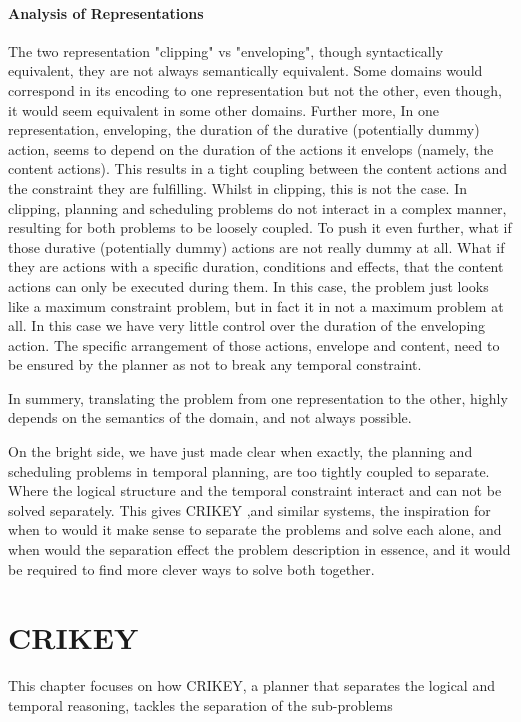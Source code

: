 \documentclass
[a4paper
,english
,parskip=half
,bibliography=totoc
]{scrreprt}
\begin{document}
        \subsubsection{Analysis of Representations}
        The two representation "clipping" vs "enveloping", though syntactically equivalent, they are not always semantically equivalent.
        Some domains would correspond in its encoding to one representation but not the other, even though, it would seem equivalent in some other domains. Further more, In one representation,
        enveloping, the duration of the durative (potentially dummy) action, seems to depend on the duration of the actions it envelops (namely, the content actions). This results in a tight coupling between the content actions and the constraint they are fulfilling. Whilst in clipping, this is not the case. In clipping, planning and scheduling problems do not interact in a complex manner, resulting for both problems to be loosely coupled.
        To push it even further, what if those durative (potentially dummy) actions are not really dummy at all. What if they are actions with a specific duration, conditions and effects, that the content actions can only be executed during them. In this case, the problem just looks like a maximum constraint problem, but in fact it in not a maximum problem at all. In this case we have very little control over the duration of the enveloping action. The specific arrangement of those actions, envelope and content, need to be ensured by the planner as not to break any temporal constraint.

         In summery, translating the problem from one representation to the other, highly depends on the semantics of the domain, and not always possible.
        
        On the bright side, we have just made clear when exactly, the planning and scheduling problems in temporal planning, are too tightly coupled to separate. Where the logical structure and the temporal constraint interact and can not be solved separately. This gives CRIKEY ,and similar systems, the inspiration for when to would it make sense to separate the problems and solve each alone, and when would the separation effect the problem description in essence, and it would be required to find more clever ways to solve both together.



\chapter{CRIKEY} \label{crikey}
   This chapter focuses on how CRIKEY, a planner that separates the logical and temporal reasoning, tackles the separation of the sub-problems 
\end{document}
